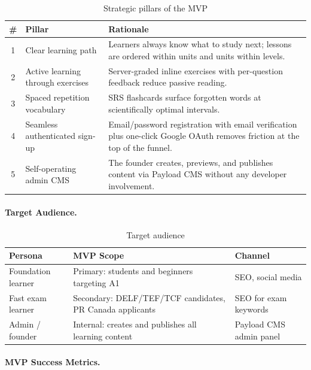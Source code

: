 \begin{table}[H]
\centering
\begin{tabularx}{\linewidth}{c X X}
\toprule
\# & Pillar & Rationale \\
\midrule
1 & Clear learning path & Learners always know what to study next; lessons are ordered within units and units within levels. \\
2 & Active learning through exercises & Server-graded inline exercises with per-question feedback reduce passive reading. \\
3 & Spaced repetition vocabulary & SRS flashcards surface forgotten words at scientifically optimal intervals. \\
4 & Seamless authenticated sign-up & Email/password registration with email verification plus one-click Google OAuth removes friction at the top of the funnel. \\
5 & Self-operating admin CMS & The founder creates, previews, and publishes content via Payload CMS without any developer involvement. \\
\bottomrule
\end{tabularx}
\caption{Strategic pillars of the MVP}
\end{table}

\paragraph{Target Audience.}

\begin{table}[H]
\centering
\begin{tabularx}{\linewidth}{X X X}
\toprule
Persona & MVP Scope & Channel \\
\midrule
Foundation learner & Primary: students and beginners targeting A1 & SEO, social media \\
Fast exam learner & Secondary: DELF/TEF/TCF candidates, PR Canada applicants & SEO for exam keywords \\
Admin / founder & Internal: creates and publishes all learning content & Payload CMS admin panel \\
\bottomrule
\end{tabularx}
\caption{Target audience}
\end{table}

\paragraph{MVP Success Metrics.}

